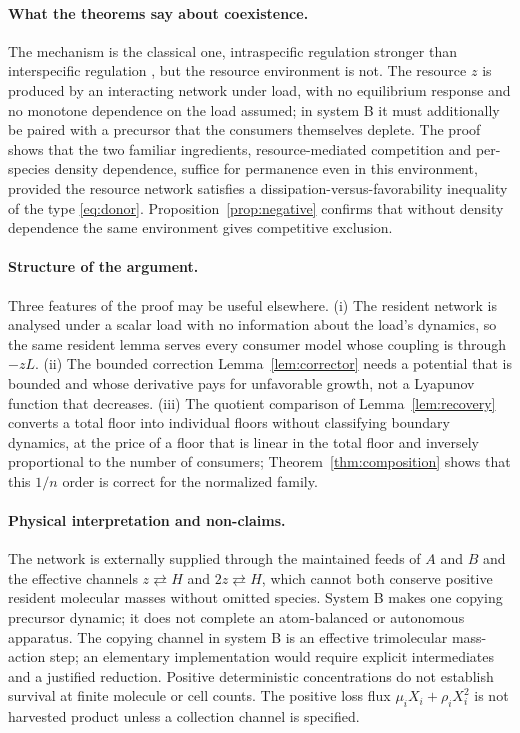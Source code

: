 \documentclass[11pt,a4paper]{article}
\theoremstyle{plain}
\theoremstyle{definition}
\theoremstyle{remark}
\begin{document}
\paragraph{What the theorems say about coexistence.}
The mechanism is the classical one, intraspecific regulation stronger than interspecific regulation \cite{Chesson2000,LobryHarmand2006}, but the resource environment is not. The resource $z$ is produced by an interacting network under load, with no equilibrium response and no monotone dependence on the load assumed; in system B it must additionally be paired with a precursor that the consumers themselves deplete. The proof shows that the two familiar ingredients, resource-mediated competition and per-species density dependence, suffice for permanence even in this environment, provided the resource network satisfies a dissipation-versus-favorability inequality of the type \eqref{eq:donor}. Proposition~\ref{prop:negative} confirms that without density dependence the same environment gives competitive exclusion.

\paragraph{Structure of the argument.}
Three features of the proof may be useful elsewhere. (i) The resident network is analysed under a scalar load with no information about the load's dynamics, so the same resident lemma serves every consumer model whose coupling is through $-zL$. (ii) The bounded correction Lemma~\ref{lem:corrector} needs a potential that is bounded and whose derivative pays for unfavorable growth, not a Lyapunov function that decreases. (iii) The quotient comparison of Lemma~\ref{lem:recovery} converts a total floor into individual floors without classifying boundary dynamics, at the price of a floor that is linear in the total floor and inversely proportional to the number of consumers; Theorem~\ref{thm:composition} shows that this $1/n$ order is correct for the normalized family.

\paragraph{Physical interpretation and non-claims.}
The network is externally supplied through the maintained feeds of $A$ and $B$ and the effective channels $z\rightleftarrows H$ and $2z\rightleftarrows H$, which cannot both conserve positive resident molecular masses without omitted species. System B makes one copying precursor dynamic; it does not complete an atom-balanced or autonomous apparatus. The copying channel in system B is an effective trimolecular mass-action step; an elementary implementation would require explicit intermediates and a justified reduction. Positive deterministic concentrations do not establish survival at finite molecule or cell counts. The positive loss flux $\mu_iX_i+\rho_iX_i^2$ is not harvested product unless a collection channel is specified.
\end{document}
